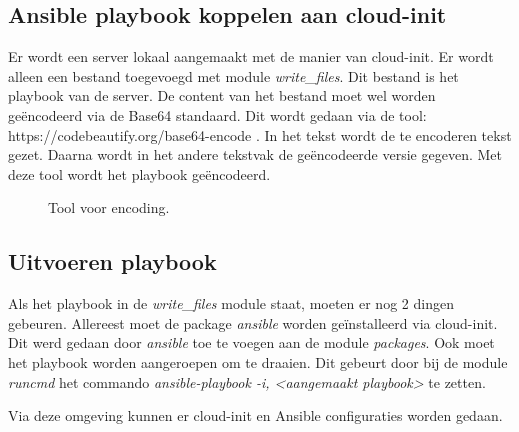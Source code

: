 \subsection{Ansible playbook koppelen aan cloud-init}
Er wordt een server lokaal aangemaakt met de manier van cloud-init. Er wordt alleen een bestand toegevoegd met module \textit{write\_files}. Dit bestand is het playbook van de server. De content van het bestand moet wel worden geëncodeerd via de Base64 standaard. Dit wordt gedaan via de tool: https://codebeautify.org/base64-encode . In het tekst wordt de te encoderen tekst gezet. Daarna wordt in het andere tekstvak de geëncodeerde versie gegeven. Met deze tool wordt het playbook geëncodeerd.
\begin{figure}[!htb]
	\caption{Tool voor encoding.}
	\label{fig:base64}
\end{figure}

\newpage
\subsection{Uitvoeren playbook}
Als het playbook in de \textit{write\_files} module staat, moeten er nog 2 dingen gebeuren. Allereest moet de package \textit{ansible} worden geïnstalleerd via cloud-init. Dit werd gedaan door \textit{ansible} toe te voegen aan de module \textit{packages}. Ook moet het playbook worden aangeroepen om te draaien. Dit gebeurt door bij de module \textit{runcmd} het commando \textit{ansible-playbook -i, <aangemaakt playbook>} te zetten.

Via deze omgeving kunnen er cloud-init en Ansible configuraties worden gedaan.



